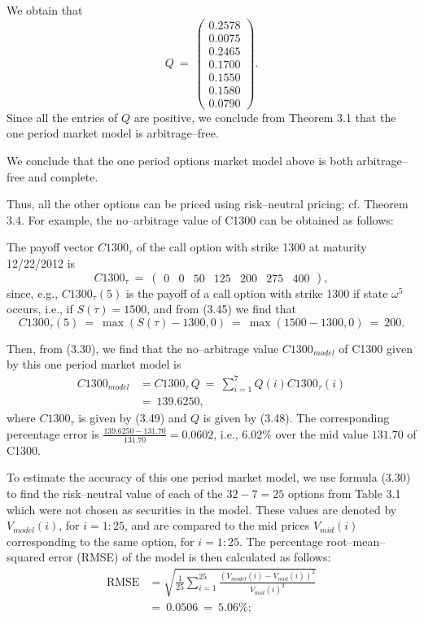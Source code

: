
We obtain that
\begin{equation}
Q \ = \ \begin{pmatrix} 0.2578 \\ 0.0075 \\ 0.2465 \\ 0.1700 \\ 0.1550 \\ 0.1580 \\ 0.0790 \end{pmatrix}.
\end{equation}
Since all the entries of $Q$ are positive, we conclude from Theorem 3.1
that the one period market model is arbitrage--free.

We conclude that the one period options market model above is both
arbitrage--free and complete.

Thus, all the other options can be priced using risk--neutral pricing;
cf. Theorem 3.4. For example, the no--arbitrage value of C1300 can be
obtained as follows:

The payoff vector $C1300_\tau$ of the call option with strike 1300 at
maturity 12/22/2012 is
\begin{equation}
C1300_\tau \ = \ \begin{pmatrix} 0 & 0 & 50 & 125 & 200 & 275 & 400 \end{pmatrix},
\end{equation}
since, e.g., $C1300_\tau(5)$ is the payoff of a call option with strike
1300 if state $\omega^5$ occurs, i.e., if $S(\tau) = 1500$, and from
(3.45) we find that
\[
C1300_\tau(5) \ = \ \max(S(\tau)-1300,0) \ = \ \max(1500-1300,0) \ = \ 200.
\]

Then, from (3.30), we find that the no--arbitrage value $C1300_{model}$
of C1300 given by this one period market model is
\begin{align*}
C1300_{model} &= C1300_\tau \, Q \ = \ \sum_{i=1}^7 Q(i) C1300_\tau(i) \\
              &= \ 139.6250,
\end{align*}
where $C1300_\tau$ is given by (3.49) and $Q$ is given by (3.48). The
corresponding percentage error is $\frac{139.6250-131.70}{131.70} =
0.0602$, i.e., $6.02\%$ over the mid value $131.70$ of C1300.

To estimate the accuracy of this one period market model, we use
formula (3.30) to find the risk--neutral value of each of the $32-7=25$
options from Table 3.1 which were not chosen as securities in the
model. These values are denoted by $V_{model}(i)$, for $i = 1:25$, and
are compared to the mid prices $V_{mid}(i)$ corresponding to the same
option, for $i = 1:25$. The percentage root--mean--squared error (RMSE)
of the model is then calculated as follows:
\begin{align*}
\text{RMSE} &= \sqrt{\frac{1}{25}\sum_{i=1}^{25} \frac{(V_{model}(i)-V_{mid}(i))^2}{V_{mid}(i)^2}} \\
            &= \ 0.0506 \ = \ 5.06\%;
\end{align*}

